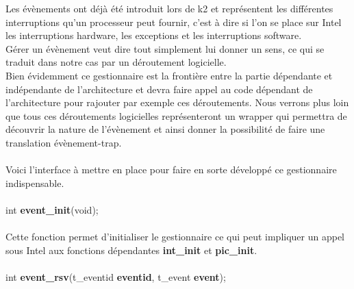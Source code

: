 \documentclass[10pt,a4wide]{article}
\begin{document}
Les \'ev\`enements ont d\'ej\`a \'et\'e introduit lors de k2 et repr\'esentent
les diff\'erentes interruptions qu'un processeur peut fournir, c'est \`a dire si l'on se place sur
Intel les interruptions hardware, les exceptions et les interruptions software.\\
G\'erer un \'ev\`enement veut dire tout simplement lui donner un sens, ce qui se traduit dans notre
cas par un d\'eroutement logicielle.\\
Bien \'evidemment ce gestionnaire est la fronti\`ere entre la partie d\'ependante et ind\'ependante de
l'architecture et devra faire appel au code d\'ependant de l'architecture  pour rajouter par exemple
ces d\'eroutements.
Nous verrons plus loin que tous ces d\'eroutements logicielles repr\'esenteront un wrapper qui permettra
de d\'ecouvrir la nature de l'\'ev\`enement et ainsi donner la possibilit\'e de faire une translation
\'ev\`enement-trap.

\paragraph{}

Voici l'interface \`a mettre en place pour faire en sorte d\'evelopp\'e ce gestionnaire indispensable.

\paragraph{}

\hspace{1.5cm}int \textbf{event\_init}(void);

\paragraph{}

Cette fonction permet d'initialiser le gestionnaire ce qui peut impliquer un appel sous Intel aux fonctions
d\'ependantes \textbf{int\_init} et \textbf{pic\_init}.

\paragraph{}

\hspace{1.5cm}int \textbf{event\_rsv}(t\_eventid \textbf{eventid},
                                      t\_event \textbf{event});

\paragraph{}
\end{document}
